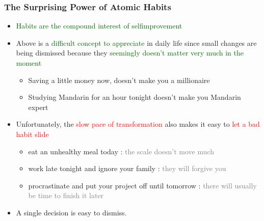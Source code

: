 \documentclass{beamer}
\begin{document}
\begin{frame}
    \frametitle{The Surprising Power of Atomic Habits}
    \begin{itemize}
        \item \textcolor{darkgreen}{Habits are the compound interest of selfimprovement}
        \item Above is a \textcolor{darkgreen}{difficult concept to appreciate} in daily life since small changes are being dismissed because they \textcolor{darkgreen}{seemingly doesn't matter very much in the moment}
        \begin{itemize}
            \item Saving a little money now, doesn't make you a millionaire 
            \item Studying Mandarin for an hour tonight doesn't make you Mandarin expert
        \end{itemize}
        \item Unfortunately, the \textcolor{red}{slow pace of transformation} also makes it easy to \textcolor{red}{let a bad habit slide}
        \begin{itemize}
            \item eat an unhealthy meal today : \textcolor{gray}{ the scale doesn’t move much}
            \item work late tonight and ignore your family : \textcolor{gray}{they will forgive you}
            \item procrastinate and put your project off until tomorrow : \textcolor{gray}{there will usually be time to finish it later}
        \end{itemize}
        \item A single decision is easy to dismiss.
        
    \end{itemize}
\end{frame}
\end{document}
